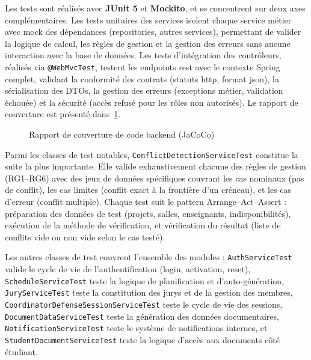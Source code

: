 Les tests sont réalisés avec \textbf{JUnit 5} et \textbf{Mockito}, et se concentrent sur deux axes complémentaires. Les tests unitaires des services isolent chaque service métier avec mock des dépendances (repositories, autres services), permettant de valider la logique de calcul, les règles de gestion et la gestion des erreurs sans aucune interaction avec la base de données. Les tests d'intégration des contrôleurs, réalisés via \texttt{@WebMvcTest}, testent les endpoints \acrshort{rest} avec le contexte Spring complet, validant la conformité des contrats (statuts \acrshort{http}, format \acrshort{json}), la sérialisation des DTOs, la gestion des erreurs (exceptions métier, validation échouée) et la sécurité (accès refusé pour les rôles non autorisés). Le rapport de couverture est présenté dans~\cref{fig:api-coverage}.

\begin{figure}[H]
    \caption{Rapport de couverture de code backend (JaCoCo)}
    \label{fig:api-coverage}
\end{figure}

Parmi les classes de test notables, \texttt{ConflictDetectionServiceTest} constitue la suite la plus importante. Elle valide exhaustivement chacune des  règles de gestion (RG1--RG6) avec des jeux de données spécifiques couvrant les cas nominaux (pas de conflit), les cas limites (conflit exact à la frontière d'un créneau), et les cas d'erreur (conflit multiple). Chaque test suit le pattern Arrange--Act--Assert : préparation des données de test (projets, salles, enseignants, indisponibilités), exécution de la méthode de vérification, et vérification du résultat (liste de conflits vide ou non vide selon le cas testé).

Les autres classes de test couvrent l'ensemble des modules : \texttt{AuthServiceTest} valide le cycle de vie de l'authentification (login, activation, reset), \texttt{ScheduleServiceTest} teste la logique de planification et d'auto-génération, \texttt{JuryServiceTest} teste la constitution des jurys et de la gestion des membres, \texttt{CoordinatorDefenseSessionServiceTest} teste le cycle de vie des sessions, \texttt{DocumentDataServiceTest} teste la génération des données documentaires, \texttt{NotificationServiceTest} teste le système de notifications internes, et \texttt{StudentDocumentServiceTest} teste la logique d'accès aux documents côté étudiant.

